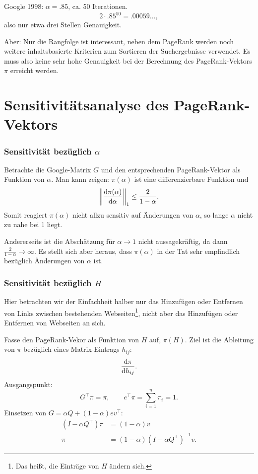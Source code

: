 Google 1998: $\alpha = \num{.85}$, ca. 50 Iterationen.
\[ 2 \cdot \num{.85}^{50} = \num{.00059}\ldots, \]
also nur etwa drei Stellen Genauigkeit.

Aber: Nur die Rangfolge ist interessant, neben dem PageRank werden noch weitere
inhaltsbasierte Kriterien zum Sortieren der Suchergebnisse verwendet. Es muss
also keine sehr hohe Genauigkeit bei der Berechnung des PageRank-Vektors $\pi$
erreicht werden.

\section{Sensitivitätsanalyse des PageRank-Vektors}
\subsubsection*{Sensitivität bezüglich $\alpha$}
Betrachte die Google-Matrix $G$ und den entsprechenden PageRank-Vektor als
Funktion von $\alpha$. Man kann zeigen: $\pi(\alpha)$ ist eine differenzierbare
Funktion und
\[ \left\| \frac{\mathrm{d} \pi(\alpha)}{\mathrm{d} \alpha} \right\|_1 \le \frac{2}{1-\alpha}. \]
Somit reagiert $\pi(\alpha)$ nicht allzu sensitiv auf Änderungen von $\alpha$,
so lange $\alpha$ nicht zu nahe bei 1 liegt.

Andererseits ist die Abschätzung für $\alpha \to 1$ nicht aussagekräftig, da
dann $\frac{2}{1-\alpha} \to \infty$. Es stellt sich aber heraus, dass
$\pi(\alpha)$ in der Tat sehr empfindlich bezüglich Änderungen von $\alpha$ ist.

\subsubsection*{Sensitivität bezüglich $H$}
Hier betrachten wir der Einfachheit halber nur das Hinzufügen oder Entfernen von
Links zwischen bestehenden Webseiten\footnote{Das heißt, die Einträge von $H$
  ändern sich.}, nicht aber das Hinzufügen oder Entfernen von Webseiten an sich.

Fasse den PageRank-Vekor als Funktion von $H$ auf, $\pi(H)$. Ziel ist die
Ableitung von $\pi$ bezüglich eines Matrix-Eintrags $h_{ij}$:
\[ \frac{\mathrm{d} \pi}{\mathrm{d} h_{ij}}. \]
Ausgangspunkt:
\[ G^\top \pi = \pi, \qquad e^\top \pi = \sum_{i=1}^n \pi_i = 1. \]
Einsetzen von $G = \alpha Q + (1-\alpha) ev^\top$:
\begin{align*}
  (I - \alpha Q^\top) \pi
  &= (1-\alpha) v \\
  \pi
  &= (1-\alpha) (I - \alpha Q^\top)^{-1} v.
\end{align*}

